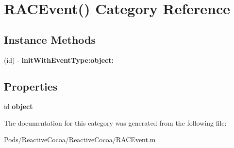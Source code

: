 \hypertarget{category_r_a_c_event_07_08}{}\section{R\+A\+C\+Event() Category Reference}
\label{category_r_a_c_event_07_08}
\subsection*{Instance Methods}
\begin{DoxyCompactItemize}
\item 
\mbox{\label{category_r_a_c_event_07_08_a345b32d87ce1a51aa3553addaf8a9108}} 
(id) -\/ {\bfseries init\+With\+Event\+Type\+:object\+:}
\end{DoxyCompactItemize}
\subsection*{Properties}
\begin{DoxyCompactItemize}
\item 
\mbox{\label{category_r_a_c_event_07_08_a8f0224f47a3a005705eb0947cdf71753}} 
id {\bfseries object}
\end{DoxyCompactItemize}


The documentation for this category was generated from the following file\+:\begin{DoxyCompactItemize}
\item 
Pods/\+Reactive\+Cocoa/\+Reactive\+Cocoa/R\+A\+C\+Event.\+m\end{DoxyCompactItemize}
